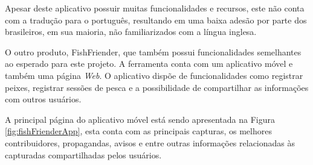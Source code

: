 Apesar deste aplicativo possuir muitas funcionalidades e recursos, este não conta com a tradução para o português, resultando em uma baixa adesão por parte dos brasileiros, em sua maioria, não familiarizados com a língua inglesa.

O outro produto, FishFriender, que também possui funcionalidades semelhantes ao esperado para este projeto. A ferramenta conta com um aplicativo móvel e também uma página \textit{Web}. O aplicativo dispõe de funcionalidades como registrar peixes, registrar sessões de pesca e a possibilidade de compartilhar as informações com outros usuários.

A principal página do aplicativo móvel está sendo apresentada na Figura \ref{fig:fishFrienderApp}, esta conta com as principais capturas, os melhores contribuidores, propagandas, avisos e entre outras informações relacionadas às capturadas compartilhadas pelos usuários.

